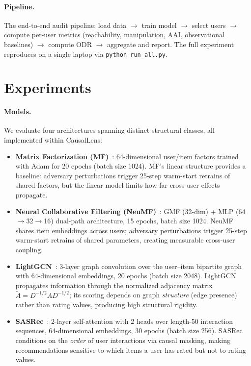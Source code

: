 \documentclass[sigconf,anonymous]{acmart}
\begin{document}
\paragraph{Pipeline.}
The end-to-end audit pipeline: load data $\rightarrow$ train model $\rightarrow$ select users $\rightarrow$ compute per-user metrics (reachability, manipulation, AAI, observational baselines) $\rightarrow$ compute ODR $\rightarrow$ aggregate and report. The full experiment reproduces on a single laptop via \texttt{python run\_all.py}.


\section{Experiments}
\label{sec:experiments}

\paragraph{Models.}
We evaluate four architectures spanning distinct structural classes, all implemented within CausalLens:
\begin{itemize}
    \item \textbf{Matrix Factorization (MF)}~\cite{koren2009matrix}: 64-dimensional user/item factors trained with Adam for 20 epochs (batch size 1024). MF's linear structure provides a baseline: adversary perturbations trigger 25-step warm-start retrains of shared factors, but the linear model limits how far cross-user effects propagate.
    \item \textbf{Neural Collaborative Filtering (NeuMF)}~\cite{he2017neural}: GMF (32-dim) + MLP (64$\to$32$\to$16) dual-path architecture, 15 epochs, batch size 1024. NeuMF shares item embeddings across users; adversary perturbations trigger 25-step warm-start retrains of shared parameters, creating measurable cross-user coupling.
    \item \textbf{LightGCN}~\cite{he2020lightgcn}: 3-layer graph convolution over the user--item bipartite graph with 64-dimensional embeddings, 20 epochs (batch size 2048). LightGCN propagates information through the normalized adjacency matrix $\tilde{A} = D^{-1/2}AD^{-1/2}$; its scoring depends on graph \emph{structure} (edge presence) rather than rating values, producing high structural rigidity.
    \item \textbf{SASRec}~\cite{kang2018self}: 2-layer self-attention with 2 heads over length-50 interaction sequences, 64-dimensional embeddings, 30 epochs (batch size 256). SASRec conditions on the \emph{order} of user interactions via causal masking, making recommendations sensitive to which items a user has rated but not to rating values.
\end{itemize}
\end{document}
